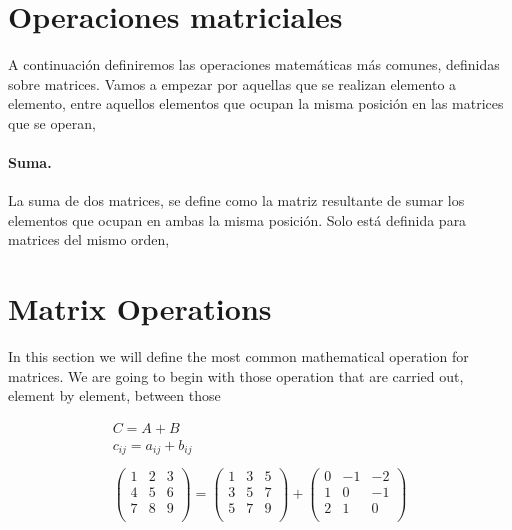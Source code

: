 \begin{paracol}{2}
\section{Operaciones matriciales}\label{opmatr}  
A continuación definiremos las operaciones matemáticas más comunes, definidas sobre matrices. Vamos a empezar por aquellas que se realizan elemento a elemento, entre aquellos elementos que ocupan la misma posición en las matrices que se operan,

\paragraph{Suma.} La suma de dos matrices, se define como la matriz resultante de sumar los elementos que ocupan en ambas la misma posición. Solo está definida para matrices del mismo orden,

\switchcolumn
\section{Matrix Operations}
In this section we will define the most common mathematical operation for matrices. We are going to begin with those operation that are carried out, element by element, between those
\end{paracol}
\begin{gather*}
C=A+B\\
c_{ij}=a_{ij}+b_{ij}\\
\\
\begin{pmatrix}
1& 2& 3\\
4& 5& 6\\
7& 8& 9\\
\end{pmatrix} =
\begin{pmatrix}
1& 3& 5\\
3& 5& 7\\
5& 7& 9\\
\end{pmatrix} +
\begin{pmatrix}
0& -1& -2\\
1& 0& -1\\
2& 1& 0\\
\end{pmatrix}
\end{gather*}

